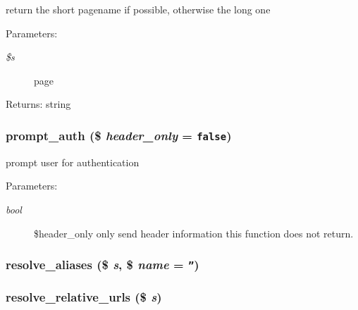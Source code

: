 return the short pagename if possible, otherwise the long one

\begin{Desc}
\item[Parameters:]
\begin{description}
\item[{\em \$s}]page \end{description}
\end{Desc}
\begin{Desc}
\item[Returns:]string \end{Desc}
\hypertarget{common_8inc_8php_80c23c9d8ac02159151d6368506b1b54}{
\subsubsection[{prompt\_\-auth}]{\setlength{\rightskip}{0pt plus 5cm}prompt\_\-auth (\$ {\em header\_\-only} = {\tt false})}}
\label{common_8inc_8php_80c23c9d8ac02159151d6368506b1b54}


prompt user for authentication

\begin{Desc}
\item[Parameters:]
\begin{description}
\item[{\em bool}]\$header\_\-only only send header information this function does not return. \end{description}
\end{Desc}
\hypertarget{common_8inc_8php_78992fdfae6cd9d7d4e8053d004d1709}{
\subsubsection[{resolve\_\-aliases}]{\setlength{\rightskip}{0pt plus 5cm}resolve\_\-aliases (\$ {\em s}, \/  \$ {\em name} = {\tt ''})}}
\label{common_8inc_8php_78992fdfae6cd9d7d4e8053d004d1709}


\hypertarget{common_8inc_8php_81eb70073067db81ab43829870f15e6d}{
\subsubsection[{resolve\_\-relative\_\-urls}]{\setlength{\rightskip}{0pt plus 5cm}resolve\_\-relative\_\-urls (\$ {\em s})}}
\label{common_8inc_8php_81eb70073067db81ab43829870f15e6d}


